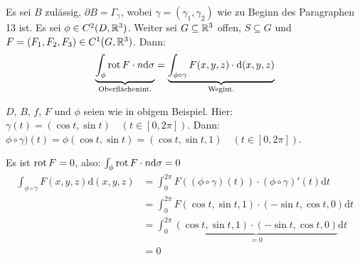 \documentclass[a4paper,twoside,DIV15,BCOR12mm,chapterprefix=true,headings=onelinechapter]{scrbook}
\begin{document}
\begin{satz}
\label{Satz 15.1}
Es sei \(B\) zul\"assig, \(\partial B=\Gamma_{\gamma}\), wobei \(\gamma=(\gamma_{1},\gamma_{2})\) wie zu Beginn des Paragraphen
13 ist. Es sei \(\phi\in C^{2}(D,\mathbb{R}^{3})\). Weiter sei \(G\subseteq\mathbb{R}^{3}\) offen, \(S\subseteq G\) und \(F=(F_{1},F_{2},F_{3})\in C^{1}(G,\mathbb{R}^{3})\). Dann:
\[
\underbrace{\int_{\phi}{\mathop{\rm rot}\nolimits F\cdot n\mathrm{d}\sigma}}_{\text{Oberfl\"achenint.}}=
    \underbrace{\int_{\phi\circ\gamma}{F(x,y,z)\cdot\mathrm{d}(x,y,z)}}_{\text{Wegint.}}
\]
\end{satz}

\begin{beispiel}
\(D,\,B,\,f,\,F\) und \(\phi\) seien wie in obigem Beispiel.
Hier: \(\gamma(t)=(\cos t,\sin t)\quad(t\in [0,2\pi])\). 
Dann: \(\phi\circ\gamma)(t)=\phi(\cos t, \sin t)=(\cos t, \sin t, 1)\quad(t\in [0,2\pi])\).

Es ist \(\mathop{\rm rot}\nolimits F=0\), also: \(\int_{\phi}{\mathop{\rm rot}\nolimits F\cdot n\mathrm{d}\sigma}=0\)
\begin{align*}
\int_{\phi\circ\gamma}{F(x,y,z)\mathrm{d}(x,y,z)}&=
    \int_{0}^{2\pi}{F((\phi\circ\gamma)(t))\cdot(\phi\circ\gamma)'(t)\mathrm{d}t}\\
&=\int_{0}^{2\pi}{F(\cos t,\sin t, 1)\cdot (-\sin t,\cos t,0)\mathrm{d}t}\\
&=\int_{0}^{2\pi}{\underbrace{(\cos t,\sin t,1)\cdot (-\sin t,\cos t,0)}_{=0}\mathrm{d}t}\\
&=0
\end{align*}
\end{beispiel}
\end{document}

